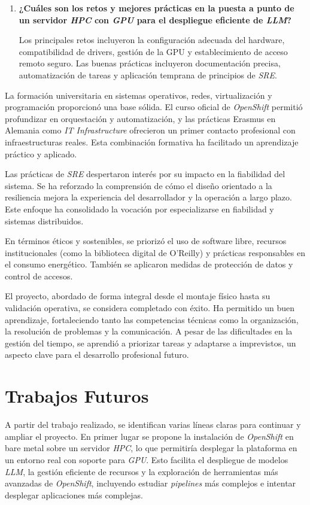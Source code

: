 \begin{enumerate}
    \newpage
    \item \textbf{¿Cuáles son los retos y mejores prácticas en la puesta a punto de un servidor \textit{HPC} con \textit{GPU} para el despliegue eficiente de \textit{LLM}?}
    
    Los principales retos incluyeron la configuración adecuada del hardware, compatibilidad de drivers, gestión de la GPU y establecimiento de acceso remoto seguro. Las buenas prácticas incluyeron documentación precisa, automatización de tareas y aplicación temprana de principios de \textit{SRE}.

\end{enumerate}

La formación universitaria en sistemas operativos, redes, virtualización y programación proporcionó una base sólida. El curso oficial de \textit{OpenShift} permitió profundizar en orquestación y automatización, y las prácticas Erasmus en Alemania como \textit{IT Infrastructure} ofrecieron un primer contacto profesional con infraestructuras reales. Esta combinación formativa ha facilitado un aprendizaje práctico y aplicado.

Las prácticas de \textit{SRE} despertaron interés por su impacto en la fiabilidad del sistema. Se ha reforzado la comprensión de cómo el diseño orientado a la resiliencia mejora la experiencia del desarrollador y la operación a largo plazo. Este enfoque ha consolidado la vocación por especializarse en fiabilidad y sistemas distribuidos.

En términos éticos y sostenibles, se priorizó el uso de software libre, recursos institucionales (como la biblioteca digital de O'Reilly) y prácticas responsables en el consumo energético. También se aplicaron medidas de protección de datos y control de accesos.

El proyecto, abordado de forma integral desde el montaje físico hasta su validación operativa, se considera completado con éxito. Ha permitido un buen aprendizaje, fortaleciendo tanto las competencias técnicas como la organización, la resolución de problemas y la comunicación. A pesar de las dificultades en la gestión del tiempo, se aprendió a priorizar tareas y adaptarse a imprevistos, un aspecto clave para el desarrollo profesional futuro.

\section{Trabajos Futuros}
A partir del trabajo realizado, se identifican varias líneas claras para continuar y ampliar el proyecto. En primer lugar se propone la instalación de \textit{OpenShift} en bare metal sobre un servidor \textit{HPC}, lo que permitiría desplegar la plataforma en un entorno real con soporte para \textit{GPU}. Esto facilita el despliegue de modelos \textit{LLM}, la gestión eficiente de recursos y la exploración de herramientas más avanzadas de \textit{OpenShift}, incluyendo estudiar \textit{pipelines} más complejos e intentar desplegar aplicaciones más complejas.

